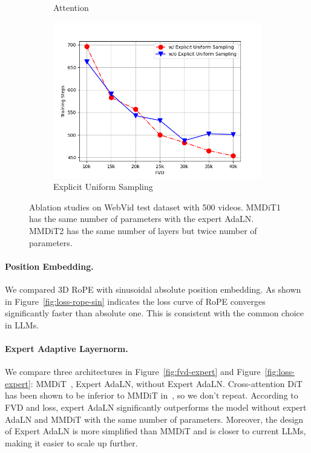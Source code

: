 \begin{figure}[h]
\begin{subfigure}[b]{0.32\textwidth}
        \caption{Attention}
        \label{fig:fvd-attn}
    \end{subfigure}
    \begin{subfigure}[b]{0.32\textwidth}
        \includegraphics[width=\textwidth]{images/fvd-uniform.png}
        \caption{Explicit Uniform Sampling}
        \label{fig:fvd-uni}
    \end{subfigure}

    \caption{Ablation studies on WebVid test dataset with 500 videos. MMDiT1 has the same number of parameters with the expert AdaLN. MMDiT2 has the same number of layers but twice number of parameters. }
    \label{fig:subfigures}
\end{figure}

\paragraph{Position Embedding.}
We compared 3D RoPE with sinusoidal absolute position embedding. As shown in Figure~\ref{fig:loss-rope-sin} indicates the loss curve of RoPE converges significantly faster than absolute one. This is consistent with the common choice in LLMs.

\paragraph{Expert Adaptive Layernorm.}
We compare three architectures in Figure~\ref{fig:fvd-expert} and Figure~\ref{fig:loss-expert}: MMDiT~\citet{esser2024scaling}, Expert AdaLN, without Expert AdaLN. Cross-attention DiT has been shown to be inferior to MMDiT in~\citep{}, so we don't repeat. According to FVD and loss, expert AdaLN significantly outperforms the model without expert AdaLN and MMDiT with the same number of parameters.
Moreover, the design of Expert AdaLN is more simplified than MMDiT and is closer to current LLMs, making it easier to scale up further.

